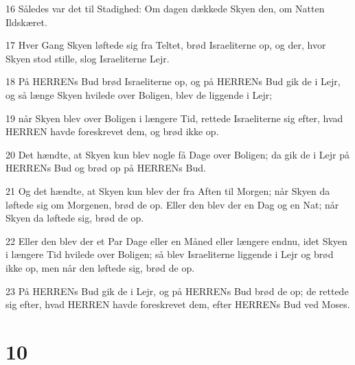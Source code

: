 \par 16 Således var det til Stadighed: Om dagen dækkede Skyen den, om Natten Ildskæret.
\par 17 Hver Gang Skyen løftede sig fra Teltet, brød Israeliterne op, og der, hvor Skyen stod stille, slog Israeliterne Lejr.
\par 18 På HERRENs Bud brød Israeliterne op, og på HERRENs Bud gik de i Lejr, og så længe Skyen hvilede over Boligen, blev de liggende i Lejr;
\par 19 når Skyen blev over Boligen i længere Tid, rettede Israeliterne sig efter, hvad HERREN havde foreskrevet dem, og brød ikke op.
\par 20 Det hændte, at Skyen kun blev nogle få Dage over Boligen; da gik de i Lejr på HERRENs Bud og brød op på HERRENs Bud.
\par 21 Og det hændte, at Skyen kun blev der fra Aften til Morgen; når Skyen da løftede sig om Morgenen, brød de op. Eller den blev der en Dag og en Nat; når Skyen da løftede sig, brød de op.
\par 22 Eller den blev der et Par Dage eller en Måned eller længere endnu, idet Skyen i længere Tid hvilede over Boligen; så blev Israeliterne liggende i Lejr og brød ikke op, men når den løftede sig, brød de op.
\par 23 På HERRENs Bud gik de i Lejr, og på HERRENs Bud brød de op; de rettede sig efter, hvad HERREN havde foreskrevet dem, efter HERRENs Bud ved Moses.

\chapter{10}

